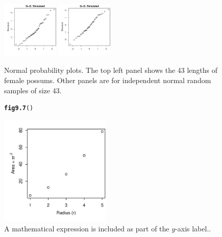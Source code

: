 \documentclass[12pt, a4paper,  BCOR=8.25mm, DIV=15]{scrartcl}\usepackage[]{graphicx}\usepackage[]{color}
\makeatletter
\newcommand{\hlstd}[1]{\textcolor[rgb]{0.345,0.345,0.345}{#1}}%
\newcommand{\hlkwd}[1]{\textcolor[rgb]{0.737,0.353,0.396}{\textbf{#1}}}%
\newenvironment{kframe}{%
 \def\at@end@of@kframe{}%
 \ifinner\ifhmode%
  \def\at@end@of@kframe{\end{minipage}}%
  \begin{minipage}{\columnwidth}%
 \fi\fi%
 \def\FrameCommand##1{\hskip\@totalleftmargin \hskip-\fboxsep
 \colorbox{shadecolor}{##1}\hskip-\fboxsep
     \hskip-\linewidth \hskip-\@totalleftmargin \hskip\columnwidth}%
 \MakeFramed {\advance\hsize-\width
   \@totalleftmargin\z@ \linewidth\hsize
   \@setminipage}}%
 {\par\unskip\endMakeFramed%
 \at@end@of@kframe}
\newenvironment{knitrout}{}{} %
\makeatother
\begin{document}
\begin{figure}[ht]
\begin{knitrout}
{\includegraphics[width=0.24\textwidth]{figs/gph-fig9_6e-7} 
\includegraphics[width=0.24\textwidth]{figs/gph-fig9_6e-8} 

}



\end{knitrout}
\vspace*{-12pt}

      \caption{Normal probability plots. The top left panel shows the 43 lengths
of female possums. Other panels are for independent normal
random samples of size 43.\label{fig:np-plots}}
\end{figure}

\begin{figure}[ht]
\vspace*{-6pt}
\begin{knitrout}
\color{fgcolor}\begin{kframe}
\begin{alltt}
\hlkwd{fig9.7}\hlstd{()}
\end{alltt}
\end{kframe}

{\centering \includegraphics[width=0.47\textwidth]{figs/gph-fig9_7e-1} 

}



\end{knitrout}
\caption{A mathematical expression is included as part of the
  $y$-axis label.\label{fig:area}.}
\end{figure}
\end{document}
